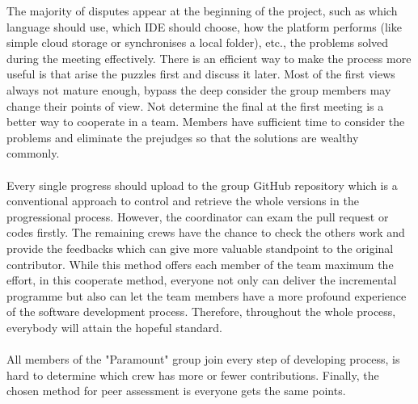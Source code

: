 \documentclass{article}
\begin{document}
	The majority of disputes appear at the beginning of the project, such as which language should use, which IDE should choose, how the platform performs (like simple cloud storage or synchronises a local folder), etc., the problems solved during the meeting effectively. There is an efficient way to make the process more useful is that arise the puzzles first and discuss it later. Most of the first views always not mature enough, bypass the deep consider the group members may change their points of view. Not determine the final at the first meeting is a better way to cooperate in a team. Members have sufficient time to consider the problems and eliminate the prejudges so that the solutions are wealthy commonly.
	\\ \hspace*{\fill} \\
	Every single progress should upload to the group GitHub repository which is a conventional approach to control and retrieve the whole versions in the progressional process. However, the coordinator can exam the pull request or codes firstly. The remaining crews have the chance to check the others work and provide the feedbacks which can give more valuable standpoint to the original contributor. While this method offers each member of the team maximum the effort, in this cooperate method, everyone not only can deliver the incremental programme but also can let the team members have a more profound experience of the software development process. Therefore, throughout the whole process, everybody will attain the hopeful standard.
	\\ \hspace*{\fill} \\
	All members of the "Paramount" group join every step of developing process, is hard to determine which crew has more or fewer contributions. Finally, the chosen method for peer assessment is everyone gets the same points.
	
	
	
\end{document}

